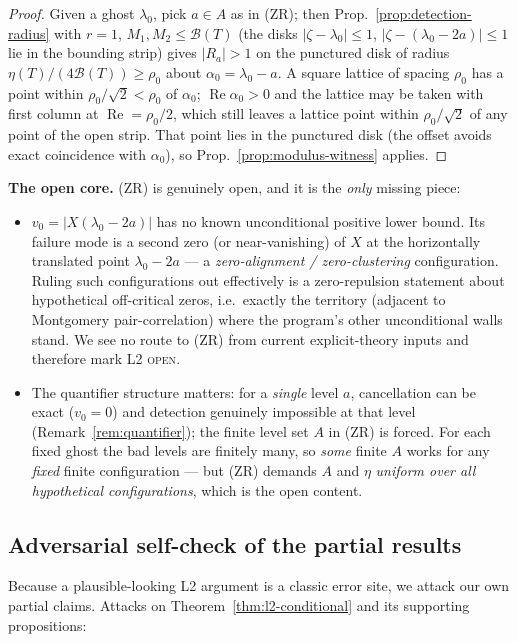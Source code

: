 \documentclass[11pt]{article}
\theoremstyle{definition}
\theoremstyle{remark}
\newcommand{\re}{\operatorname{Re}}
\begin{document}
\begin{proof}
Given a ghost $\lambda_0$, pick $a\in A$ as in (ZR); then
Prop.~\ref{prop:detection-radius} with $r=1$, $M_1,M_2\le\mathcal{B}(T)$
(the disks $|\zeta-\lambda_0|\le1$, $|\zeta-(\lambda_0-2a)|\le1$ lie in the
bounding strip) gives $|R_a|>1$ on the punctured disk of radius
$\eta(T)/(4\mathcal{B}(T))\ge\rho_0$ about $\alpha_0=\lambda_0-a$. A square
lattice of spacing $\rho_0$ has a point within $\rho_0/\sqrt2<\rho_0$ of
$\alpha_0$; $\re\alpha_0>0$ and the lattice may be taken with first column at
$\re=\rho_0/2$, which still leaves a lattice point within $\rho_0/\sqrt2$ of
any point of the open strip. That point lies in the punctured disk (the
offset avoids exact coincidence with $\alpha_0$), so
Prop.~\ref{prop:modulus-witness} applies.
\end{proof}

\textbf{The open core.} (ZR) is genuinely open, and it is the \emph{only}
missing piece:
\begin{itemize}
\item $v_0=|X(\lambda_0-2a)|$ has no known unconditional positive lower
bound. Its failure mode is a second zero (or near-vanishing) of $X$ at the
horizontally translated point $\lambda_0-2a$ --- a \emph{zero-alignment /
zero-clustering} configuration. Ruling such configurations out effectively
is a zero-repulsion statement about hypothetical off-critical zeros, i.e.\
exactly the territory (adjacent to Montgomery pair-correlation) where the
program's other unconditional walls stand. We see no route to (ZR) from
current explicit-theory inputs and therefore mark L2 \textsc{open}.
\item The quantifier structure matters: for a \emph{single} level $a$,
cancellation can be exact ($v_0=0$) and detection genuinely impossible at
that level (Remark~\ref{rem:quantifier}); the finite level set $A$ in (ZR)
is forced. For each fixed ghost the bad levels are finitely many, so
\emph{some} finite $A$ works for any \emph{fixed} finite configuration ---
but (ZR) demands $A$ and $\eta$ \emph{uniform over all hypothetical
configurations}, which is the open content.
\end{itemize}

\subsection{Adversarial self-check of the partial results}
\label{sec:self-check}

Because a plausible-looking L2 argument is a classic error site, we attack
our own partial claims. Attacks on Theorem~\ref{thm:l2-conditional} and its
supporting propositions:
\end{document}
